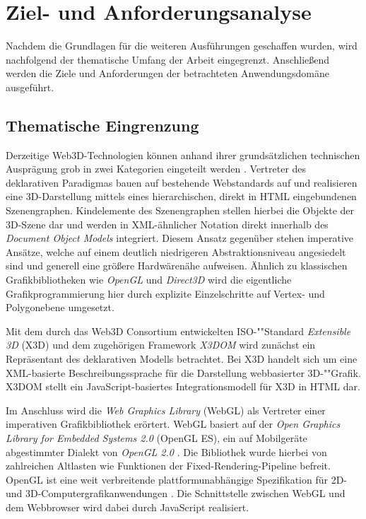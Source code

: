 \chapter{Ziel- und Anforderungsanalyse}
\label{CHAP:REQUIREMENTS}

Nachdem die Grundlagen für die weiteren Ausführungen geschaffen wurden, wird nachfolgend der thematische Umfang der Arbeit eingegrenzt. Anschließend werden die Ziele und Anforderungen der betrachteten Anwendungsdomäne ausgeführt.

\section{Thematische Eingrenzung}

Derzeitige Web3D-Technologien können anhand ihrer grundsätzlichen technischen Ausprägung grob in zwei Kategorien eingeteilt werden \autocite{Jankowski:2013:DII:2466533.2466547}. Vertreter des deklarativen Paradigmas bauen auf bestehende Webstandards auf und realisieren eine 3D-Darstellung mittels eines hierarchischen, direkt in HTML eingebundenen Szenengraphen. Kindelemente des Szenengraphen stellen hierbei die Objekte der 3D-Szene dar und werden in XML-ähnlicher Notation direkt innerhalb des \emph{Document Object Models} integriert. Diesem Ansatz gegenüber stehen imperative Ansätze, welche auf einem deutlich niedrigeren Abstraktionsniveau angesiedelt sind und generell eine größere Hardwärenähe aufweisen. Ähnlich zu klassischen Grafikbibliotheken wie \emph{OpenGL} und \emph{Direct3D} wird die eigentliche Grafikprogrammierung hier durch explizite Einzelschritte auf Vertex- und Polygonebene umgesetzt.

Mit dem durch das Web3D Consortium entwickelten ISO-""Standard \emph{Extensible 3D} (X3D) und dem zugehörigen Framework \emph{X3DOM} wird zunächst ein Repräsentant des deklarativen Modells betrachtet. Bei X3D handelt sich um eine XML-basierte Beschreibungssprache für die Darstellung webbasierter 3D-""Grafik. X3DOM stellt ein JavaScript-basiertes Integrationsmodell für X3D in HTML dar.

Im Anschluss wird die \emph{Web Graphics Library} (WebGL) als Vertreter einer imperativen Grafikbibliothek erörtert. WebGL basiert auf der \emph{Open Graphics Library for Embedded Systems 2.0} (OpenGL ES), ein auf Mobilgeräte abgestimmter Dialekt von \emph{OpenGL 2.0} \autocite{KHRONOS_OPENGL_ES_20_SPEC}. Die Bibliothek wurde hierbei von zahlreichen Altlasten wie Funktionen der Fixed-Rendering-Pipeline befreit. OpenGL ist eine weit verbreitende plattformunabhängige Spezifikation für 2D- und 3D-Computergrafikanwendungen \autocite{OPENGL_ABOUT}. Die Schnittstelle zwischen WebGL und dem Webbrowser wird dabei durch JavaScript realisiert.

